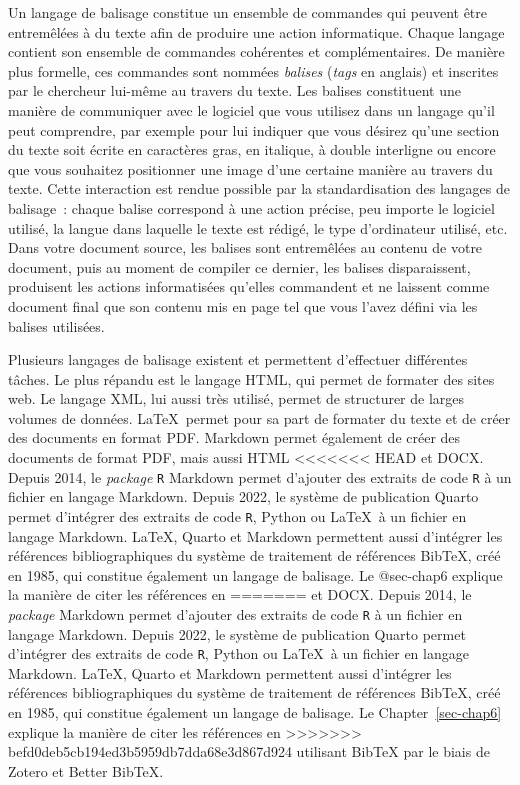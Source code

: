\documentclass[
  letterpaper,
]{scrbook}
\begin{document}
Un langage de balisage constitue un ensemble de commandes qui peuvent
être entremêlées à du texte afin de produire une action informatique.
Chaque langage contient son ensemble de commandes cohérentes et
complémentaires. De manière plus formelle, ces commandes sont nommées
\emph{balises} (\emph{tags} en anglais) et inscrites par le chercheur
lui-même au travers du texte. Les balises constituent une manière de
communiquer avec le logiciel que vous utilisez dans un langage qu'il
peut comprendre, par exemple pour lui indiquer que vous désirez qu'une
section du texte soit écrite en caractères gras, en italique, à double
interligne ou encore que vous souhaitez positionner une image d'une
certaine manière au travers du texte. Cette interaction est rendue
possible par la standardisation des langages de balisage~: chaque balise
correspond à une action précise, peu importe le logiciel utilisé, la
langue dans laquelle le texte est rédigé, le type d'ordinateur utilisé,
etc. Dans votre document source, les balises sont entremêlées au contenu
de votre document, puis au moment de compiler ce dernier, les balises
disparaissent, produisent les actions informatisées qu'elles commandent
et ne laissent comme document final que son contenu mis en page tel que
vous l'avez défini via les balises utilisées.

Plusieurs langages de balisage existent et permettent d'effectuer
différentes tâches. Le plus répandu est le langage HTML, qui permet de
formater des sites web. Le langage XML, lui aussi très utilisé, permet
de structurer de larges volumes de données. \LaTeX~permet pour sa part
de formater du texte et de créer des documents en format PDF. Markdown
permet également de créer des documents de format PDF, mais aussi HTML
<<<<<<< HEAD
et DOCX. Depuis 2014, le \emph{package} \texttt{R} Markdown permet
d'ajouter des extraits de code \texttt{R} à un fichier en langage
Markdown. Depuis 2022, le système de publication Quarto permet
d'intégrer des extraits de code \texttt{R}, Python ou \LaTeX~à un
fichier en langage Markdown. \LaTeX, Quarto et Markdown permettent aussi
d'intégrer les références bibliographiques du système de traitement de
références BibTeX, créé en 1985, qui constitue également un langage de
balisage. Le @sec-chap6 explique la manière de citer les références en
=======
et DOCX. Depuis 2014, le \emph{package} \R Markdown permet d'ajouter des
extraits de code \texttt{R} à un fichier en langage Markdown. Depuis
2022, le système de publication Quarto permet d'intégrer des extraits de
code \texttt{R}, Python ou \LaTeX~à un fichier en langage Markdown.
\LaTeX, Quarto et Markdown permettent aussi d'intégrer les références
bibliographiques du système de traitement de références BibTeX, créé en
1985, qui constitue également un langage de balisage. Le
Chapter~\ref{sec-chap6} explique la manière de citer les références en
>>>>>>> befd0deb5cb194ed3b5959db7dda68e3d867d924
utilisant BibTeX par le biais de Zotero et Better BibTeX.
\end{document}
